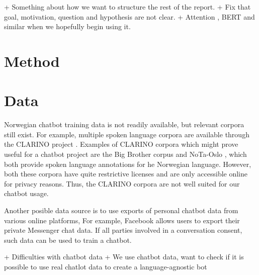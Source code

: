 \documentclass{article}
\begin{document}
+ Something about how we want to structure the rest of the report.  + Fix that
goal, motivation, question and hypothesis are not clear.  + Attention
\cite{Bahdanau2015}, BERT and similar when we hopefully begin using it.

\section{Method}


\section{Data}

Norwegian chatbot training data is not readily available, but relevant corpora
still exist.  For example, multiple spoken language corpora are available
through the CLARINO project \cite{clarino-description}. Examples of CLARINO
corpora which might prove useful for a chatbot project are the Big Brother
corpus \cite{clarino-bb} and NoTa-Oslo \cite{clarino-nota}, which both provide
spoken language annotations for he Norwegian language. However, both these
corpora have quite restrictive licenses and are only accessible online for
privacy reasons. Thus, the CLARINO corpora are not well suited for our chatbot
usage.

Another posible data source is to use exports of personal chatbot data from
various online platforms, For example, Facebook allows users to export their
private Messenger chat data. If all parties involved in a conversation consent,
such data can be used to train a chatbot.

+ Difficulties with chatbot data + We use chatbot data, want to check if it is
possible to use real chatlot data to create a language-agnostic bot
\end{document}

